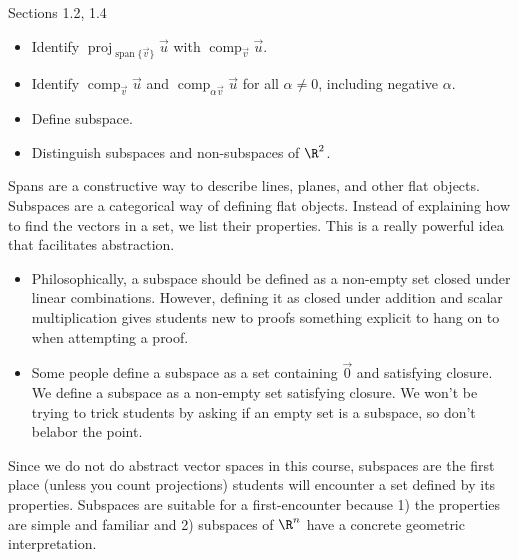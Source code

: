 \documentclass{problemset}
\DeclareMathOperator{\Span}{span}
\DeclareMathOperator{\Comp}{comp}
\DeclareMathOperator{\Proj}{proj}
\begin{document}
\begin{lesson}
	\newpage

	Sections 1.2, 1.4

	\begin{itemize}
		\item Identify $\Proj_{\Span\{\vec v\}}\vec u$ with $\Comp_{\vec v}\vec u$.
		\item Identify $\Comp_{\vec v}\vec u$ and $\Comp_{\alpha\vec v}\vec u$
			for all $\alpha\neq 0$, including negative $\alpha$.
		\item Define subspace.
		\item Distinguish subspaces and non-subspaces of $\R^2$.
	\end{itemize}

	Spans are a constructive way to describe lines, planes, and other
	flat objects. Subspaces are a categorical way of defining flat objects.
	Instead of explaining how to find the vectors in a set, we list their
	properties. This is a really powerful idea that facilitates abstraction.

	\begin{annotation}
		\begin{notes}
			\begin{itemize}
			\item	Philosophically, a subspace should be defined
			as a non-empty set closed under linear combinations.
			However, defining it as closed under addition and scalar 
			multiplication gives students new to proofs
			something explicit to hang on to when attempting a proof.
			\item Some people define a subspace as a set containing
			$\vec 0$ and satisfying closure. We define a subspace
			as a non-empty set satisfying closure. We won't be trying
			to trick students by asking if an empty set is a subspace,
			so don't belabor the point.
			\end{itemize}
		\end{notes}
	\end{annotation}
	Since we do not do abstract vector spaces in this course, subspaces are
	the first place (unless you count projections) students will encounter 
	a set defined by its properties. Subspaces are suitable for a first-encounter
	because 1) the properties are simple and familiar and 2) subspaces of $\R^n$
	have a concrete geometric interpretation.

	\newpage
\end{lesson}
\end{document}
